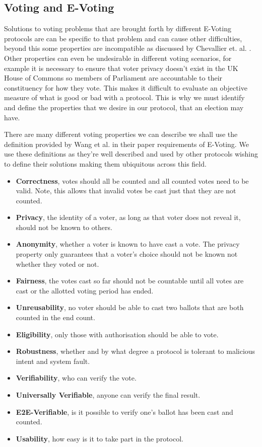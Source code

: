 \documentclass{entcs}
\begin{document}
\subsection{Voting and E-Voting} \label{sec: voting}
Solutions to voting problems that are brought forth by different E-Voting protocols are can be specific to that problem and can cause other difficulties, beyond this some properties are incompatible as discussed by Chevallier et. al. \cite{Chevallier-mames06onsome}. Other properties can even be undesirable in different voting scenarios, for example it is necessary to ensure that voter privacy doesn't exist in the UK House of Commons so members of Parliament are accountable to their constituency for how they vote. This makes it difficult to evaluate an objective measure of what is good or bad with a protocol. This is why we must identify and define the properties that we desire in our protocol, that an election may have.

There are many different voting properties we can describe we shall use the definition provided by Wang et al. \cite{RequirementOfEVoting} in their paper requirements of E-Voting. We use these definitions as they're well described and used by other protocols wishing to define their solutions making them ubiquitous across this field.
\begin{itemize}
  \item {\bfseries Correctness}, votes should all be counted and all counted votes need to be valid. Note, this allows that invalid votes be cast just that they are not counted.
  \item {\bfseries Privacy}, the identity of a voter, as long as that voter does not reveal it, should not be known to others.
  \item {\bfseries Anonymity}, whether a voter is known to have cast a vote. The privacy property only guarantees that a voter's choice should not be known not whether they voted or not.
  \item {\bfseries Fairness}, the votes cast so far should not be countable until all votes are cast or the allotted voting period has ended.
  \item {\bfseries Unreusability}, no voter should be able to cast two ballots that are both counted in the end count.
  \item {\bfseries Eligibility}, only those with authorisation should be able to vote.
  \item {\bfseries Robustness}, whether and by what degree a protocol is tolerant to malicious intent and system fault.
  \item {\bfseries Verifiability}, who can verify the vote.
  \item {\bfseries Universally Verifiable}, anyone can verify the final result. 
  \item {\bfseries E2E-Verifiable}, is it possible to verify one's ballot has been cast and counted.
  \item {\bfseries Usability}, how easy is it to take part in the protocol.
\end{itemize}
\end{document}
